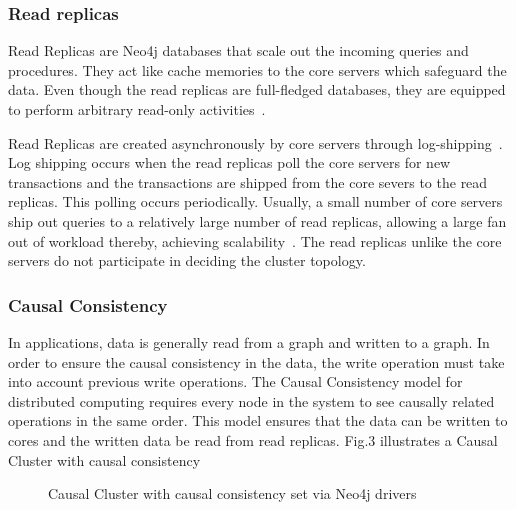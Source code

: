 \documentclass[9pt,twocolumn,twoside]{../../styles/osajnl}
\begin{document}
\subsubsection{Read replicas}
Read Replicas are Neo4j databases that scale out the incoming queries and procedures. They act like cache memories to the core servers which safeguard the data. Even though the read replicas are full-fledged databases, they are equipped to perform arbitrary read-only activities~\cite{www-neo4j-causal}.

Read Replicas are created asynchronously by core servers through log-shipping~\cite{www-neo4j-causal}. Log shipping occurs when the read replicas poll the core servers for new transactions and the transactions are shipped from the core severs to the read replicas. This polling occurs periodically. Usually, a small number of core servers ship out queries to a relatively large number of read replicas, allowing a large fan out of workload thereby, achieving scalability~\cite{www-neo4j-causal}. The read replicas unlike the core servers do not participate in deciding the cluster topology. 

\subsubsection{Causal Consistency}
In applications, data is generally read from a graph and written to a graph. In order to ensure the causal consistency in the data, the write operation must take into account previous write operations. The Causal Consistency model for distributed computing requires every node in the system to see causally related operations in the same order. This model ensures that the data can be written to cores and the written data be read from read replicas.
Fig.3 illustrates a Causal Cluster with causal consistency

\begin{figure}[htbp]
\centering
{}
\caption{Causal Cluster with causal consistency set via Neo4j drivers ~\cite{www-neo4j-causal}}
\label{fig:false-color}
\end{figure}
\end{document}

